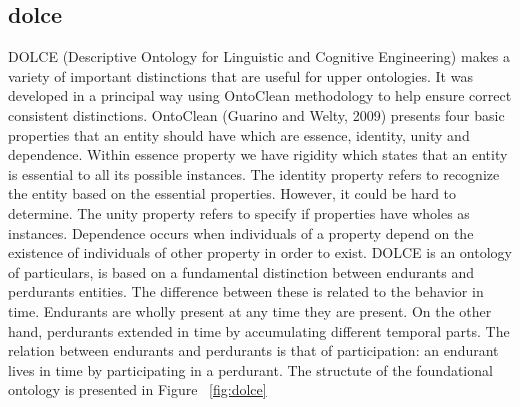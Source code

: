\subsection{dolce}

DOLCE (Descriptive Ontology for Linguistic and Cognitive Engineering) makes a variety of important distinctions that are useful for upper ontologies. It was developed in a principal way using OntoClean methodology to help ensure correct consistent distinctions. OntoClean (Guarino and Welty, 2009) presents four basic properties that an entity should have which are essence, identity, unity and dependence. Within essence property we have rigidity which states that an entity is essential to all its possible instances. The identity property refers to recognize the entity based on the essential properties. However, it could be hard to determine. The unity property refers to specify if properties have wholes as instances. Dependence occurs when individuals of a property depend on the existence of individuals of other property in order to exist.
DOLCE is an ontology of particulars, is based on a fundamental distinction between endurants and perdurants entities. The difference between these is related to the behavior in time. Endurants are wholly present at any time they are present. On the other hand, perdurants extended in time by accumulating different temporal parts. The relation between endurants and perdurants is that of participation: an endurant lives in time by participating in a perdurant. The structute of the foundational ontology is presented in Figure ~\ref{fig:dolce}
